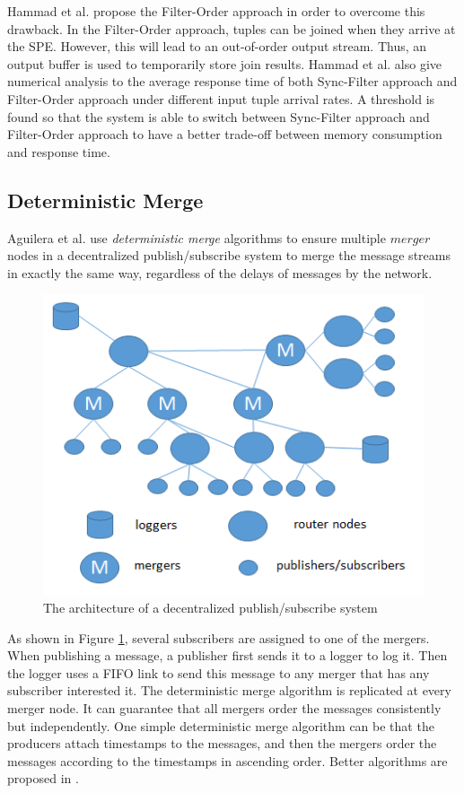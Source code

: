 \documentclass[a4paper, 11pt, twoside]{report}
\begin{document}
Hammad et al. propose the Filter-Order approach in order to overcome this drawback. In the Filter-Order approach, tuples can be joined when they arrive at the SPE. However, this will lead to an out-of-order output stream. Thus, an output buffer is used to temporarily store join results. Hammad et al. also give numerical analysis to the average response time of both Sync-Filter approach and Filter-Order approach under different input tuple arrival rates. A threshold is found so that the system is able to switch between Sync-Filter approach and Filter-Order approach to have a better trade-off between memory consumption and response time.\\

\subsection{Deterministic Merge}

Aguilera et al. \cite{Aguilera:2000:EAB:343477.343620} use \textit{deterministic merge} algorithms to ensure multiple $merger$ nodes in a decentralized publish/subscribe system to merge the message streams in exactly the same way, regardless of the delays of messages by the network.\\

\begin{figure}[h]
\centering
\includegraphics[scale=0.65]{deterministic-merge}
\caption{The architecture of a decentralized publish/subscribe system \cite{Aguilera:2000:EAB:343477.343620}}\label{fig:deterministic_merge}
\end{figure}

As shown in Figure \ref{fig:deterministic_merge}, several subscribers are assigned to one of the mergers. When publishing a message, a publisher first sends it to a logger to log it. Then the logger uses a FIFO link to send this message to any merger that has any subscriber interested it. The deterministic merge algorithm is replicated at every merger node. It can guarantee that all mergers order the messages consistently but independently. One simple deterministic merge algorithm can be that the producers attach timestamps to the messages, and then the mergers order the messages according to the timestamps in ascending order. Better algorithms are proposed in \cite{Aguilera:2000:EAB:343477.343620}.\\
\end{document}
